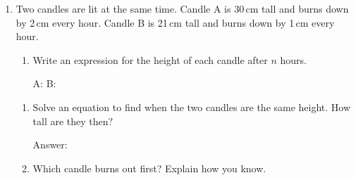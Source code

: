 \documentclass[11pt,a4paper]{article}
\newcommand{\ansline}[1][2.2cm]{\underline{\hspace{#1}}}
\newcommand{\workspace}[1]{\par\vspace{#1}\hfill Answer: \ansline[3.5cm]\par}
\newcommand{\candle}[3]{%
  \begin{scope}[shift={(#1,0)}]
  \pgfmathsetmacro{\ch}{0.062*#2}
  \draw[fill=yellow!8,line width=0.5pt] (-0.16,0) rectangle (0.16,\ch);
  \draw (0,\ch) -- (0,\ch+0.08);
  \fill[orange!55] (0,\ch+0.05) .. controls (0.1,\ch+0.14) and (0.06,\ch+0.26) .. (0,\ch+0.34)
    .. controls (-0.06,\ch+0.26) and (-0.1,\ch+0.14) .. (0,\ch+0.05);
  \node[font=\scriptsize,above,inner sep=1pt] at (0,\ch+0.34) {#2\,cm};
  \node[font=\scriptsize,below,inner sep=2pt] at (0,0) {#3};
  \end{scope}}
\newcommand{\candlepair}[4]{%
  \begin{scope}[shift={(#1,0)}]
  \draw[line width=0.8pt] (-0.42,0) -- (1.32,0);
  \candle{0}{#3}{A}\candle{0.9}{#4}{B}
  \node[font=\scriptsize\bfseries] at (0.45,-0.62) {After #2};
  \end{scope}}
\begin{document}
\begin{enumerate}
\item \begin{minipage}[t]{0.5\linewidth}
  Two candles are lit at the same time. Candle A is 30\,cm tall and burns down
  by 2\,cm every hour. Candle B is 21\,cm tall and burns down by 1\,cm every hour.
  \begin{enumerate}
  \item Write an expression for the height of each candle after $n$ hours.\par
    A: \ansline[2.4cm] \quad B: \ansline[2.4cm]
  \end{enumerate}
  \end{minipage}\hfill
  \begin{minipage}[t]{0.47\linewidth}\raggedleft\vspace{0pt}
  \end{minipage}
  \begin{enumerate}[start=2]
  \item Solve an equation to find when the two candles are the same height.
    How tall are they then?
    \workspace{1.6cm}
  \item Which candle burns out first? Explain how you know.\par\vspace{9pt}\hrulefill
  \end{enumerate}


\end{enumerate}
\end{document}
